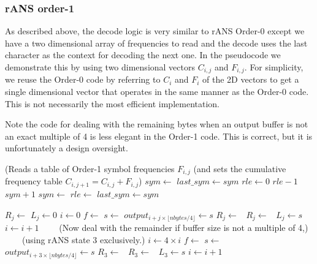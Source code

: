 \documentclass[a4paper]{article}
\begin{document}
\subsubsection*{rANS order-1}

As described above, the decode logic is very similar to rANS Order-0 except we have a two dimensional array of frequencies to read and the decode uses the last character as the context for decoding the next one.
In the pseudocode we demonstrate this by using two dimensional vectors $C_{i,j}$ and $F_{i,j}$.
For simplicity, we reuse the Order-0 code by referring to $C_i$ and $F_i$ of the 2D vectors to get a single dimensional vector that operates in the same manner as the Order-0 code.
This is not necessarily the most efficient implementation.

Note the code for dealing with the remaining bytes when an output buffer is not an exact multiple of 4 is less elegant in the Order-1 code.
This is correct, but it is unfortunately a design oversight.

\vskip 0.5cm

\begin{algorithmic}[1]
\Statex (Reads a table of Order-1 symbol frequencies $F_{i,j}$
\Statex (and sets the cumulative frequency table $C_{i,j+1} = C_{i,j}+F_{i,j}$)
\State $sym \gets$ 
\State $last\_sym \gets sym$
\State $rle \gets 0$
\Repeat
  \State {}
    \settowidth{\maxwidth}{sym}
    \State {} $rle-1$
    \State {} $sym+1$
  \Else
    \State $sym \gets$ 
      \State $rle \gets$ 
    \EndIf
  \EndIf
  \State $last\_sym \gets sym$
\EndProcedure

\Statex
{}
  \State {} 
    \State $R_j \gets$ 
    \State $L_j \gets 0$
  \EndFor
  \State $i \gets 0$
      \State $f \gets$ 
      \State $s \gets$ 
      \State $output_{i + j \times \lfloor nbytes/4 \rfloor} \gets s$
      \State $R_j \gets$\ 
      \State $R_j \gets$\ 
      \State $L_j \gets s$
    \EndFor
    \State $i \gets i+1$
  \EndWhile
  \Statex \ \ \ \ (Now deal with the remainder if buffer size is not a multiple of 4,)
  \Statex \ \ \ \ (using rANS state 3 exclusively.)
  \State $i \gets 4 \times i$
    \State $f \gets$ 
    \State $s \gets$ 
    \State $output_{i + 3 \times \lfloor nbytes/4 \rfloor} \gets s$
    \State $R_3 \gets$\ 
    \State $R_3 \gets$\ 
    \State $L_3 \gets s$
    \State $i \gets i+1$
\EndWhile
\EndProcedure
\end{algorithmic}
\end{document}
